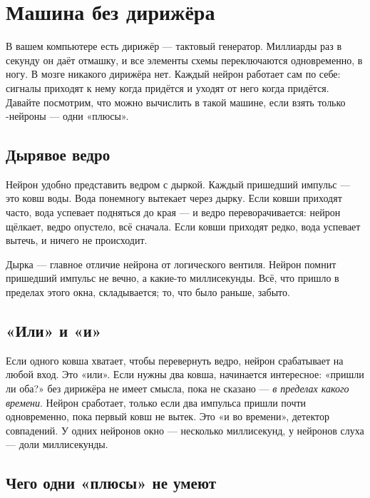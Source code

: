 \chapter{Машина без дирижёра}

В вашем компьютере есть дирижёр --- тактовый генератор. Миллиарды раз в секунду он даёт отмашку, и все элементы схемы переключаются одновременно, в ногу. В мозге никакого дирижёра нет. Каждый нейрон работает сам по себе: сигналы приходят к нему когда придётся и уходят от него когда придётся. Давайте посмотрим, что можно вычислить в такой машине, если взять только -нейроны --- одни «плюсы».

\section*{Дырявое ведро}

Нейрон удобно представить ведром с дыркой. Каждый пришедший импульс --- это ковш воды. Вода понемногу вытекает через дырку. Если ковши приходят часто, вода успевает подняться до края --- и ведро переворачивается: нейрон щёлкает, ведро опустело, всё сначала. Если ковши приходят редко, вода успевает вытечь, и ничего не происходит.


Дырка --- главное отличие нейрона от логического вентиля. Нейрон помнит пришедший импульс не вечно, а какие-то миллисекунды. Всё, что пришло в пределах этого окна, складывается; то, что было раньше, забыто.

\section*{«Или» и «и»}

Если одного ковша хватает, чтобы перевернуть ведро, нейрон срабатывает на любой вход. Это «или». Если нужны два ковша, начинается интересное: «пришли ли оба?» без дирижёра не имеет смысла, пока не сказано --- \emph{в пределах какого времени}. Нейрон сработает, только если два импульса пришли почти одновременно, пока первый ковш не вытек. Это «и во времени», детектор совпадений. У одних нейронов окно --- несколько миллисекунд, у нейронов слуха --- доли миллисекунды.

\section*{Чего одни «плюсы» не умеют}

